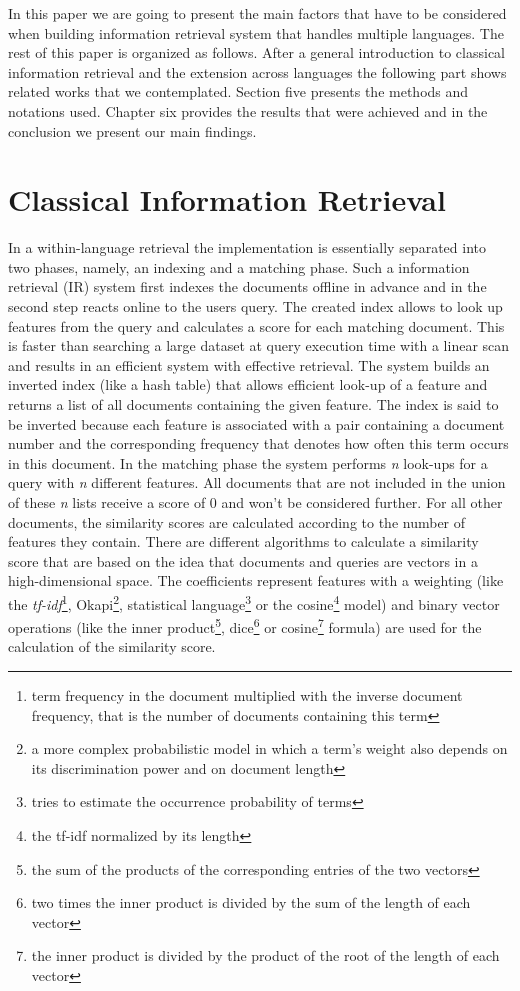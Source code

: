 \documentclass[journal]{IEEEtran}
\begin{document}
In this paper we are going to present the main factors that have to be considered when building information retrieval system that handles multiple languages.
The rest of this paper is organized as follows.
After a general introduction to classical information retrieval and the extension across languages the following part shows related works that we contemplated.
Section five presents the methods and notations used.
Chapter six provides the results that were achieved and in the conclusion we present our main findings.



\section{Classical Information Retrieval}
In a within-language retrieval the implementation is essentially separated into two phases, namely, an indexing and a matching phase.
Such a information retrieval (IR) system first indexes the documents offline in advance and in the second step reacts online to the users query.
The created index allows to look up features from the query and calculates a score for each matching document.
This is faster than searching a large dataset at query execution time with a linear scan and results in an efficient system with effective retrieval.
The system builds an inverted index (like a hash table) that allows efficient look-up of a feature and returns a list of all documents containing the given feature.
The index is said to be inverted because each feature is associated with a pair containing a document number and the corresponding frequency that denotes how often this term occurs in this document.
In the matching phase the system performs \textit{n} look-ups for a query with \textit{n} different features.
All documents that are not included in the union of these \textit{n} lists receive a score of 0 and won't be considered further.
For all other documents, the similarity scores are calculated according to the number of features they contain.
There are different algorithms to calculate a similarity score that are based on the idea that documents and queries are vectors in a high-dimensional space.
The coefficients represent features with a weighting (like the \textit{tf-idf}\footnote{term frequency in the document multiplied with the inverse document frequency, that is the number of documents containing this term}, Okapi\footnote{a more complex probabilistic model in which a term's weight also depends on its discrimination power and on document length}, statistical language\footnote{tries to estimate the occurrence probability of terms} or the cosine\footnote{the tf-idf normalized by its length} model) and binary vector operations (like the inner product\footnote{the sum of the products of the corresponding entries of the two vectors}, dice\footnote{two times the inner product is divided by the sum of the length of each vector} or cosine\footnote{the inner product is divided by the product of the root of the length of each vector} formula) are used for the calculation of the similarity score.
\end{document}
